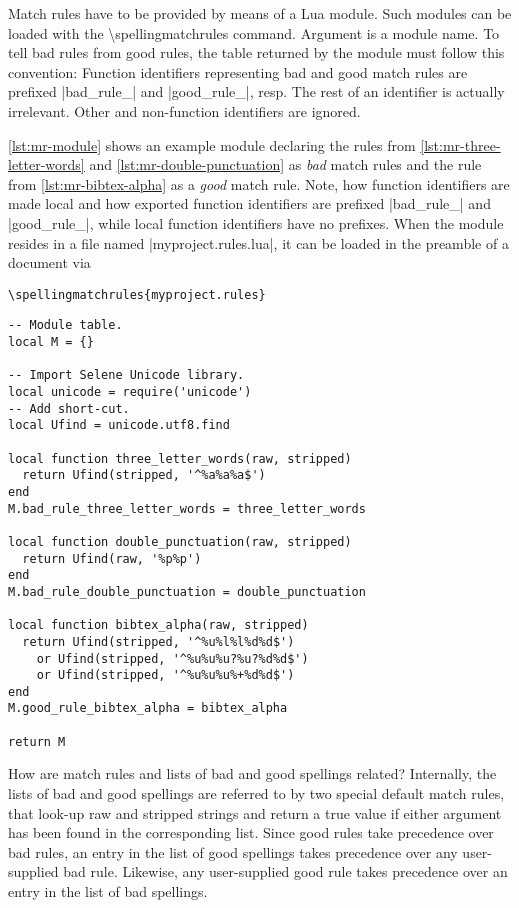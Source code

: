 \documentclass[11pt]{article}
\newcommand*{\cmd}[1]{\mbox{\ttfamily\textbackslash#1}}
\newcommand*{\macro}[1]{\cmd{#1}\marginpar{\cmd{#1}}}
\begin{document}
Match rules have to be provided by means of a Lua module.  Such modules
can be loaded with the \macro{spellingmatchrules} command.  Argument is
a module name.  To tell bad rules from good rules, the table returned by
the module must follow this convention: Function identifiers
representing bad and good match rules are prefixed |bad_rule_| and
|good_rule_|, resp.  The rest of an identifier is actually irrelevant.
Other and non-function identifiers are ignored.

\autoref{lst:mr-module} shows an example module declaring the rules from
\autoref{lst:mr-three-letter-words} and
\autoref{lst:mr-double-punctuation} as \emph{bad} match rules and the
rule from \autoref{lst:mr-bibtex-alpha} as a \emph{good} match rule.
Note, how function identifiers are made local and how exported function
identifiers are prefixed |bad_rule_| and |good_rule_|, while local
function identifiers have no prefixes.  When the module resides in a
file named |myproject.rules.lua|, it can be loaded in the preamble of a
document via
\begin{lstlisting}[language={[LaTeX]TeX}]
\spellingmatchrules{myproject.rules}
\end{lstlisting}

\begin{lstlisting}[style=Lua, float=p, label=lst:mr-module, caption={A module containing two bad and one good match rule.}]
-- Module table.
local M = {}

-- Import Selene Unicode library.
local unicode = require('unicode')
-- Add short-cut.
local Ufind = unicode.utf8.find

local function three_letter_words(raw, stripped)
  return Ufind(stripped, '^%a%a%a$')
end
M.bad_rule_three_letter_words = three_letter_words

local function double_punctuation(raw, stripped)
  return Ufind(raw, '%p%p')
end
M.bad_rule_double_punctuation = double_punctuation

local function bibtex_alpha(raw, stripped)
  return Ufind(stripped, '^%u%l%l%d%d$')
    or Ufind(stripped, '^%u%u%u?%u?%d%d$')
    or Ufind(stripped, '^%u%u%u%+%d%d$')
end
M.good_rule_bibtex_alpha = bibtex_alpha

return M
\end{lstlisting}

How are match rules and lists of bad and good spellings related?
Internally, the lists of bad and good spellings are referred to by two
special default match rules, that look-up raw and stripped strings and
return a true value if either argument has been found in the
corresponding list.  Since good rules take precedence over bad rules, an
entry in the list of good spellings takes precedence over any
user-supplied bad rule.  Likewise, any user-supplied good rule takes
precedence over an entry in the list of bad spellings.
\end{document}
